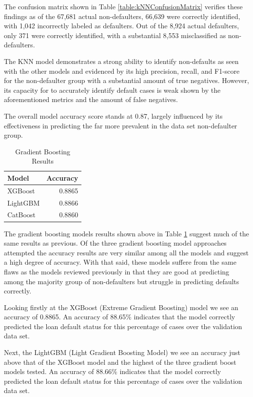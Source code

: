 \documentclass[12pt]{article}
\begin{document}
The confusion matrix shown in Table \ref{table:kNNConfusionMatrix} verifies these findings as of the 67,681 actual non-defaulters, 66,639 were correctly identified, with 1,042 incorrectly labeled as defaulters. Out of the 8,924 actual defaulters, only 371 were correctly identified, with a substantial 8,553 misclassified as non-defaulters. 

The KNN model demonstrates a strong ability to identify non-defaults as seen with the other models and evidenced by its high precision, recall, and F1-score for the non-defaulter group with a substantial amount of true negatives. However, its capacity for to accurately identify default cases is weak shown by the aforementioned metrics and the amount of false negatives.

The overall model accuracy score stands at 0.87, largely influenced by its effectiveness in predicting the far more prevalent in the data set non-defaulter group. 

\begin{table}[htbp]
    \centering
    \caption{Gradient Boosting Results}
    \begin{tabular}{lr}
        \toprule
        Model & Accuracy \\
        \midrule
        XGBoost & 0.8865 \\
        LightGBM & 0.8866 \\
        CatBoost & 0.8860 \\
        \bottomrule
    \end{tabular}
    \label{table:gradientBoostingResults}
\end{table}

The gradient boosting models results shown above in Table \ref{table:gradientBoostingResults} suggest much of the same results as previous. Of the three gradient boosting model approaches attempted the accuracy results are very similar among all the models and suggest a high degree of accuracy. With that said, these models suffere from the same flaws as the models reviewed previously in that they are good at predicting among the majority group of non-defaulters but struggle in predicting defaults correctly.

Looking firstly at the XGBoost (Extreme Gradient Boosting) model we see an accuracy of 0.8865. An accuracy of 88.65\% indicates that the model correctly predicted the loan default status for this percentage of cases over the validation data set.

Next, the LightGBM (Light Gradient Boosting Model) we see an accuracy just above that of the XGBoost model and the highest of the three gradient boost models tested. An accuracy of 88.66\% indicates that the model correctly predicted the loan default status for this percentage of cases over the validation data set.
\end{document}
